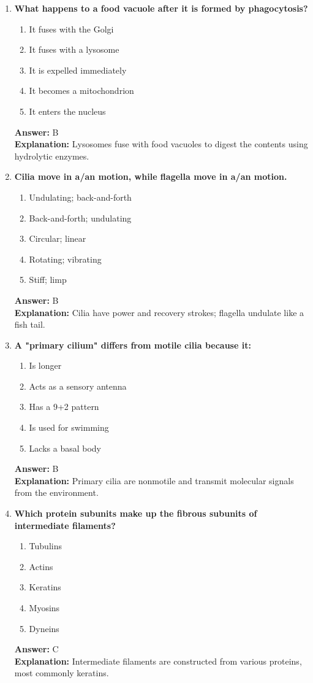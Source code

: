 \documentclass[11pt, a4paper]{article}
\begin{document}
\begin{enumerate}[leftmargin=*, label=\arabic*.]
\item \textbf{What happens to a food vacuole after it is formed by phagocytosis?}
\begin{enumerate}[label=\Alph*.]
\item It fuses with the Golgi
\item It fuses with a lysosome
\item It is expelled immediately
\item It becomes a mitochondrion
\item It enters the nucleus
\end{enumerate}
\textbf{Answer:} B \\
\textbf{Explanation:} Lysosomes fuse with food vacuoles to digest the contents using hydrolytic enzymes.

\item \textbf{Cilia move in a/an \underline{\hspace{1cm}} motion, while flagella move in a/an \underline{\hspace{1cm}} motion.}
\begin{enumerate}[label=\Alph*.]
\item Undulating; back-and-forth
\item Back-and-forth; undulating
\item Circular; linear
\item Rotating; vibrating
\item Stiff; limp
\end{enumerate}
\textbf{Answer:} B \\
\textbf{Explanation:} Cilia have power and recovery strokes; flagella undulate like a fish tail.

\item \textbf{A "primary cilium" differs from motile cilia because it:}
\begin{enumerate}[label=\Alph*.]
\item Is longer
\item Acts as a sensory antenna
\item Has a 9+2 pattern
\item Is used for swimming
\item Lacks a basal body
\end{enumerate}
\textbf{Answer:} B \\
\textbf{Explanation:} Primary cilia are nonmotile and transmit molecular signals from the environment.

\item \textbf{Which protein subunits make up the fibrous subunits of intermediate filaments?}
\begin{enumerate}[label=\Alph*.]
\item Tubulins
\item Actins
\item Keratins
\item Myosins
\item Dyneins
\end{enumerate}
\textbf{Answer:} C \\
\textbf{Explanation:} Intermediate filaments are constructed from various proteins, most commonly keratins.


\end{enumerate}
\end{document}
